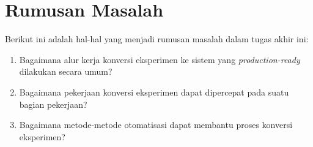 \section{Rumusan Masalah}

Berikut ini adalah hal-hal yang menjadi rumusan masalah dalam tugas akhir ini:

\begin{enumerate}
    \item Bagaimana alur kerja konversi eksperimen ke sistem yang \textit{production-ready} dilakukan secara umum?
    \item Bagaimana pekerjaan konversi eksperimen dapat dipercepat pada suatu bagian pekerjaan?
    \item Bagaimana metode-metode otomatisasi dapat membantu proses konversi eksperimen?
\end{enumerate}
